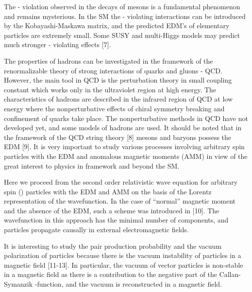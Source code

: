 \documentclass[a4paper,12pt]{article}
\begin{document}
The \coordHE{} - violation observed in the decays of mesons is a fundamental
phenomenon and remains mysterious. In the SM the \coordHE{} - violating
interactions can be introduced by the Kobayashi-Maskawa matrix, and the
predicted EDM's of elementary particles are extremely small. Some SUSY and
multi-Higgs models may predict much stronger \coordHE{} - violating effects [7].

The properties of hadrons can be investigated in the framework of the
renormalizable theory of strong interactions of quarks and gluons - QCD.
However, the main tool in QCD is the perturbation theory in small coupling
constant \coordHE{} which works only in the ultraviolet region at high
energy. The characteristics of hadrons are described in the infrared region
of QCD at low energy where the nonperturbative effects of chiral symmetry
breaking and confinement of quarks take place. The nonperturbative methods
in QCD have not developed yet, and some models of hadrons are used. It
should be noted that in the framework of the QCD string theory [8] mesons
and baryons possess the EDM [9]. It is very important to study various
processes involving arbitrary spin particles with the EDM and anomalous
magnetic moments (AMM) in view of the great interest to physics in framework
and beyond the SM.

Here we proceed from the second order relativistic wave equation for
arbitrary spin (\coordHE{}) particles with the EDM and AMM on the basis of the
Lorentz representation \coordHE{} of the wavefunction. In the case
of ``normal'' magnetic moment and the absence of the EDM, such a scheme was
introduced in [10]. The wavefunction in this approach has the minimal number
\coordHE{} of components, and particles propagate causally in external
electromagnetic fields.

It is interesting to study the pair production probability and the vacuum
polarization of particles because there is the vacuum instability of
particles in a magnetic field [11-13]. In particular, the vacuum of vector
particles is non-stable in a magnetic field as there is a contribution to
the negative part of the Callan-Symanzik \myHighlight{$\beta $}\coordHE{}-function, and the vacuum
is reconstructed in a magnetic field.
\end{document}
